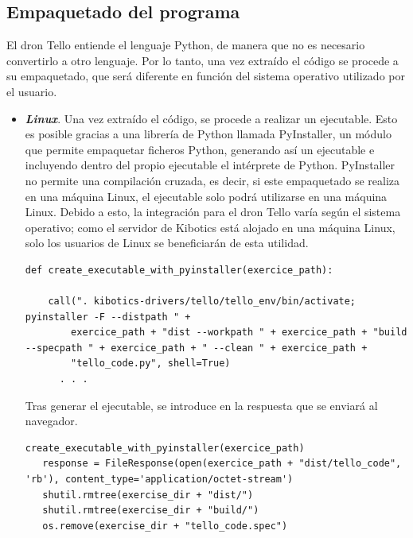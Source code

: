 \documentclass{report}
\begin{document}
\subsection{Empaquetado del programa}

El dron Tello entiende el lenguaje Python, de manera que no es necesario convertirlo a otro lenguaje. Por lo tanto, una vez extraído el código se procede a su empaquetado, que será diferente en función del sistema operativo utilizado por el usuario.
\\
\begin{itemize}
	\item \textit{\textbf{Linux}}. Una vez extraído el código, se procede a realizar un ejecutable. Esto es posible gracias a una librería de Python llamada PyInstaller, un módulo que permite empaquetar ficheros Python, generando así un ejecutable e incluyendo dentro del propio ejecutable el intérprete de Python. PyInstaller no permite una compilación cruzada, es decir, si este empaquetado se realiza en una máquina Linux, el ejecutable solo podrá utilizarse en una máquina Linux. Debido a esto, la integración para el dron Tello varía según el sistema operativo; como el servidor de Kibotics está alojado en una máquina Linux, solo los usuarios de Linux se beneficiarán de esta utilidad.
\begin{lstlisting}[frame=single,breaklines=true, label="Creación ejecutable con PyInstaller", caption="Creación ejecutable con PyInstaller",  captionpos=b]
   def create_executable_with_pyinstaller(exercice_path):
    		      
   	call(". kibotics-drivers/tello/tello_env/bin/activate; pyinstaller -F --distpath " +
      	exercice_path + "dist --workpath " + exercice_path + "build --specpath " + exercice_path + " --clean " + exercice_path +
      	"tello_code.py", shell=True)
      . . . 
\end{lstlisting}
	Tras generar el ejecutable, se introduce en la respuesta que se enviará al navegador.
	\\
\begin{lstlisting}[frame=single,breaklines=true, label="Respuesta a la petición para Linux", caption="Respuesta a la petición para Linux",  captionpos=b]
   create_executable_with_pyinstaller(exercice_path)
   response = FileResponse(open(exercice_path + "dist/tello_code", 'rb'), content_type='application/octet-stream')
   shutil.rmtree(exercise_dir + "dist/")
   shutil.rmtree(exercise_dir + "build/")
   os.remove(exercise_dir + "tello_code.spec")
\end{lstlisting}
	

\end{itemize}
\end{document}
